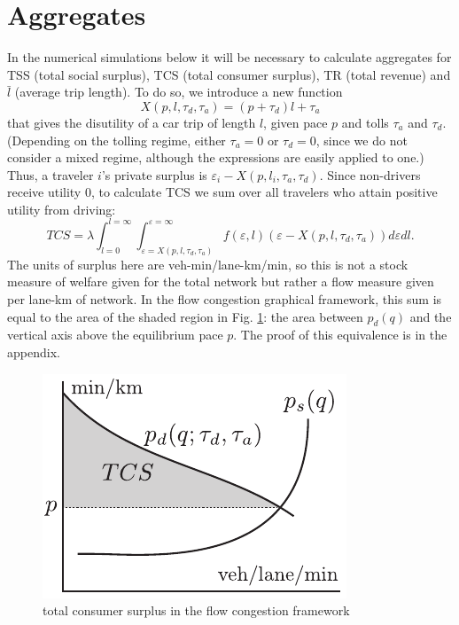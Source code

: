 \documentclass[preprint,authoryear]{elsarticle}
\newcommand{\taud}{\tau_d}
\newcommand{\taua}{\tau_a}
\newcommand{\ve}{\varepsilon}
\begin{document}
\section{Aggregates}\label{sec:aggregates}

In the numerical simulations below it will be necessary to calculate aggregates for TSS (total social surplus), TCS (total consumer surplus), TR (total revenue) and $\bar{l}$ (average trip length).  To do so, we introduce a new function
\begin{equation}
	X(p,l,\taud,\taua) = (p+\taud)l + \taua
\end{equation}
that gives the disutility of a car trip of length $l$, given pace $p$ and tolls $\taua$ and $\taud$. (Depending on the tolling regime, either $\taua=0$  or $\taud=0$, since we do not consider a mixed regime, although the expressions are easily applied to one.) Thus, a traveler $i$'s private surplus is $\varepsilon_i-X(p,l_i,\taua,\taud)$. Since non-drivers receive utility 0, to calculate TCS we sum over all travelers who attain positive utility from driving:
\begin{equation}\label{eq:TCS}
	TCS = \lambda \int_{l=0}^{l=\infty} \int_{\ve=X(p,l,\taud,\taua)}^{\ve=\infty} f(\ve, l)(\varepsilon-X(p,l,\taud,\taua)) d\ve dl.
\end{equation}
The units of surplus here are veh-min/lane-km/min, so this is not a stock measure of welfare given for the total network but rather a flow measure given per lane-km of network. In the flow congestion graphical framework, this sum is equal to the area of the shaded region in Fig. \ref{fig:surplus}: the area between $p_d(q)$ and the vertical axis above the equilibrium pace $p$. The proof of this equivalence is in the appendix.

\begin{figure}
	\centering
	\includegraphics[width=.45\textwidth]{img/surplus}
	\caption{total consumer surplus in the flow congestion framework}
	\label{fig:surplus}
\end{figure}
\end{document}
